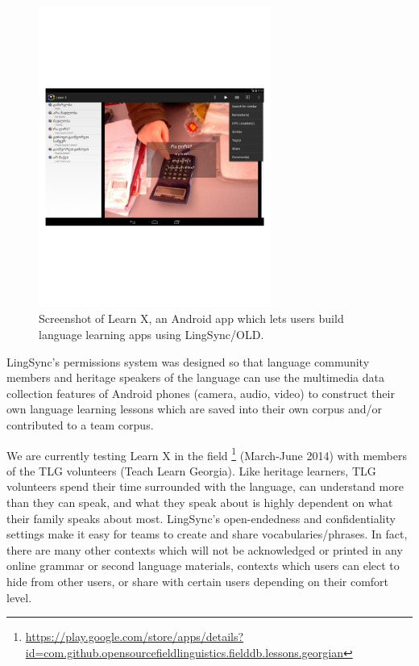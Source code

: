 \documentclass[11pt]{article}
\begin{document}
\begin{figure}
\begin{center}
\includegraphics[width=3in]{images/learnX}
\caption{Screenshot of Learn X, an Android app which lets users build language
learning apps using LingSync/OLD.}
\label{learn_x_screenshot}
\end{center}
\end{figure}



LingSync's permissions system was designed so that language community members
and heritage speakers of the language can use the multimedia data collection
features of Android phones (camera, audio, video) to construct their own
language learning lessons which are saved into their own corpus and/or
contributed to a team corpus.

We are currently testing Learn X in the field%
\footnote{\url{https://play.google.com/store/apps/details?id=com.github.opensourcefieldlinguistics.fielddb.lessons.georgian}} %
(March-June 2014) with members of the TLG volunteers (Teach Learn Georgia).
Like heritage learners, TLG volunteers spend their time surrounded with the
language, can understand more than they can speak, and what they speak about is
highly dependent on what their family speaks about most. LingSync's
open-endedness and confidentiality settings make it easy for teams to create
and share vocabularies/phrases.
In fact, there are many other contexts which will not be acknowledged or printed
in any online grammar or second language materials, contexts which users can
elect to hide from other users, or share with certain users depending on their
comfort level.
\end{document}
